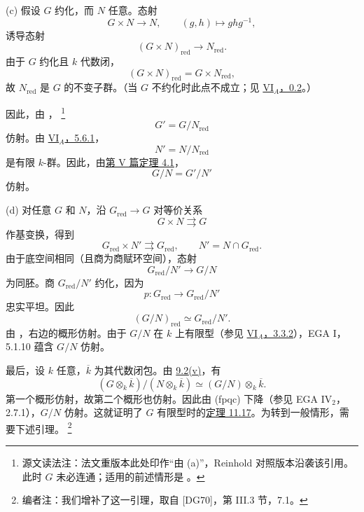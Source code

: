 \smallskip
{}\label{case:sga3-VIB-11.17-c}%
\noindent\textup{(c)}
假设 \(G\) 约化，而 \(N\) 任意。态射
\[
  G\times N\longrightarrow N,\qquad
  (g,h)\longmapsto ghg^{-1},
\]
诱导态射
\[
  (G\times N)_{\mathrm{red}}\longrightarrow N_{\mathrm{red}}.
\]
由于 \(G\) 约化且 \(k\) 代数闭，
\[
  (G\times N)_{\mathrm{red}}=G\times N_{\mathrm{red}},
\]
故 \(N_{\mathrm{red}}\) 是 \(G\) 的不变子群。\textup{（当 \(G\) 不约化时此点不成立；见 \hyperref[sga3:VIA:0.2]{VI\(_A\)，0.2}。）}

因此，由 \textup{}，%
\begingroup
\renewcommand{\thefootnote}{\fnsymbol{footnote}}%
\footnote[1]{\label{note:sga3-VIB-11.17-case-c-source-reading}
源文读法注：法文重版本此处印作“由 \textup{(a)}”，Reinhold 对照版本沿袭该引用。此时 \(G\) 未必连通；适用的前述情形是 \textup{}。}
\endgroup\ 
\[
  G'=G/N_{\mathrm{red}}
\]
仿射。由 \hyperref[prop:sga3-VIA-5.6.1]{VI\(_A\)，5.6.1}，
\[
  N'=N/N_{\mathrm{red}}
\]
是有限 \(k\)-群。因此，由\hyperref[thm:sga3-V-4.1]{第 V 篇定理 4.1}，
\[
  G/N=G'/N'
\]
仿射。

\smallskip
{}\label{case:sga3-VIB-11.17-d}%
\noindent\textup{(d)}
对任意 \(G\) 和 \(N\)，沿 \(G_{\mathrm{red}}\to G\) 对等价关系
\[
  G\times N\rightrightarrows G
\]
作基变换，得到
\label{form:sga3-VIB-11.17-reduced-relation}%
\[
  G_{\mathrm{red}}\times N'
    \rightrightarrows G_{\mathrm{red}},
  \qquad
  N'=N\cap G_{\mathrm{red}}.
\]
由于底空间相同\textup{（且商为商赋环空间）}，态射
\[
  G_{\mathrm{red}}/N'\longrightarrow G/N
\]
为同胚。商 \(G_{\mathrm{red}}/N'\) 约化，因为
\[
  p:G_{\mathrm{red}}\longrightarrow G_{\mathrm{red}}/N'
\]
忠实平坦。因此
\[
  (G/N)_{\mathrm{red}}
    \simeq G_{\mathrm{red}}/N'.
\]
由 \textup{}，右边的概形仿射。由于 \(G/N\) 在 \(k\) 上有限型\textup{（参见 \hyperref[thm:sga3-VIA-3.3.2]{VI\(_A\)，3.3.2}）}，EGA I，5.1.10 蕴含 \(G/N\) 仿射。

最后，设 \(k\) 任意，\(\overline{k}\) 为其代数闭包。由 \hyperref[concl:sga3-VIB-9.2-v]{9.2\textup{(v)}}，有
\[
  (G\otimes_k\overline{k})/
    (N\otimes_k\overline{k})
  \simeq
  (G/N)\otimes_k\overline{k}.
\]
第一个概形仿射，故第二个概形也仿射。因此由 \textup{(fpqc)} 下降\textup{（参见 EGA IV\(_2\)，2.7.1）}，\(G/N\) 仿射。这就证明了 \(G\) 有限型时的\hyperref[thm:sga3-VIB-11.17]{定理 11.17}。为转到一般情形，需要下述引理。%
\footnote{\label{note:sga3-VIB-133}编者注：我们增补了这一引理，取自 \textup{[DG70]}，第 III.3 节，7.1。}

